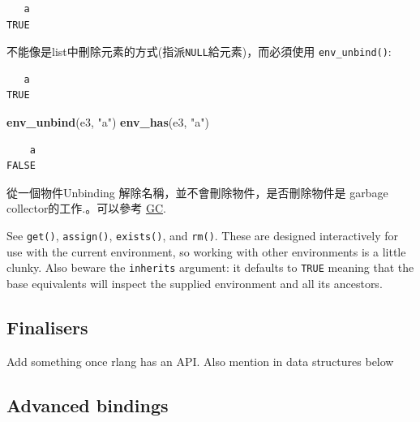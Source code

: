 \documentclass[]{book}
\newenvironment{Shaded}{\begin{snugshade}}{\end{snugshade}}
\newcommand{\KeywordTok}[1]{\textcolor[rgb]{0.13,0.29,0.53}{\textbf{#1}}}
\newcommand{\NormalTok}[1]{#1}
\newcommand{\OperatorTok}[1]{\textcolor[rgb]{0.81,0.36,0.00}{\textbf{#1}}}
\newcommand{\OtherTok}[1]{\textcolor[rgb]{0.56,0.35,0.01}{#1}}
\newcommand{\StringTok}[1]{\textcolor[rgb]{0.31,0.60,0.02}{#1}}
\theoremstyle{definition}
\theoremstyle{definition}
\theoremstyle{definition}
\theoremstyle{remark}
\begin{document}
\begin{verbatim}
   a 
TRUE 
\end{verbatim}

不能像是list中刪除元素的方式(指派\texttt{NULL}給元素)，而必須使用
\texttt{env\_unbind()}:

\begin{Shaded}
\end{Shaded}

\begin{verbatim}
   a 
TRUE 
\end{verbatim}

\begin{Shaded}
\begin{Highlighting}[]
\KeywordTok{env_unbind}\NormalTok{(e3, }\StringTok{"a"}\NormalTok{)}
\KeywordTok{env_has}\NormalTok{(e3, }\StringTok{"a"}\NormalTok{)}
\end{Highlighting}
\end{Shaded}

\begin{verbatim}
    a 
FALSE 
\end{verbatim}

從一個物件Unbinding 解除名稱，並不會刪除物件，是否刪除物件是 garbage
collector的工作.。可以參考 \protect\hyperlink{gc}{GC}.

See \texttt{get()}, \texttt{assign()}, \texttt{exists()}, and
\texttt{rm()}. These are designed interactively for use with the current
environment, so working with other environments is a little clunky. Also
beware the \texttt{inherits} argument: it defaults to \texttt{TRUE}
meaning that the base equivalents will inspect the supplied environment
and all its ancestors.

\hypertarget{finalisers}{%
\subsection{Finalisers}\label{finalisers}}

{Add something once rlang has an API. Also mention in data structures
below}

\hypertarget{advanced-bindings}{%
\subsection{Advanced bindings}\label{advanced-bindings}}
\end{document}
